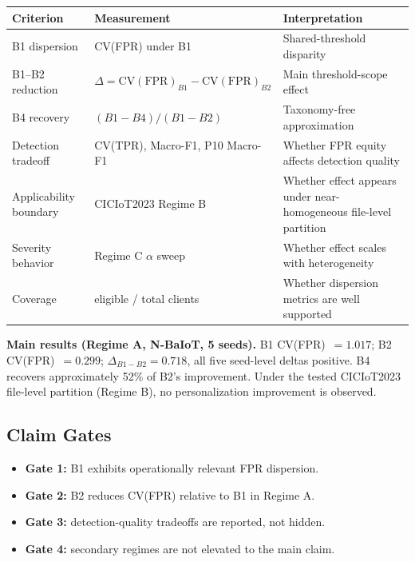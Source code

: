 \vspace{0.2em}
\begin{tabularx}{\linewidth}{@{} l l X @{}}
\toprule
\textbf{Criterion} & \textbf{Measurement} & \textbf{Interpretation}\\
\midrule
B1 dispersion          & CV(FPR) under B1                            & Shared-threshold disparity\\[2pt]
B1--B2 reduction        & $\Delta = \mathrm{CV(FPR)}_{B1} - \mathrm{CV(FPR)}_{B2}$ & Main threshold-scope effect\\[2pt]
B4 recovery             & $(B1 - B4)/(B1 - B2)$                       & Taxonomy-free approximation\\[2pt]
Detection tradeoff      & CV(TPR), Macro-F1, P10 Macro-F1             & Whether FPR equity affects detection quality\\[2pt]
Applicability boundary  & CICIoT2023 Regime B                         & Whether effect appears under near-homogeneous file-level partition\\[2pt]
Severity behavior       & Regime C $\alpha$ sweep                     & Whether effect scales with heterogeneity\\[2pt]
Coverage                & eligible / total clients                    & Whether dispersion metrics are well supported\\
\bottomrule
\end{tabularx}

\vspace{0.4em}

\begin{tcolorbox}[ambercallout]
\small
\textbf{Main results (Regime A, N-BaIoT, 5 seeds).}
B1 CV(FPR)~$= 1.017$; B2 CV(FPR)~$= 0.299$; $\Delta_{B1-B2} = 0.718$, all five seed-level
deltas positive. B4 recovers approximately 52\% of B2's improvement. Under the tested
CICIoT2023 file-level partition (Regime B), no personalization improvement is observed.
\end{tcolorbox}

\subsection{Claim Gates}

\begin{itemize}
  \item \textbf{Gate 1:} B1 exhibits operationally relevant FPR dispersion.
  \item \textbf{Gate 2:} B2 reduces CV(FPR) relative to B1 in Regime A.
  \item \textbf{Gate 3:} detection-quality tradeoffs are reported, not hidden.
  \item \textbf{Gate 4:} secondary regimes are not elevated to the main claim.
\end{itemize}

\clearpage
